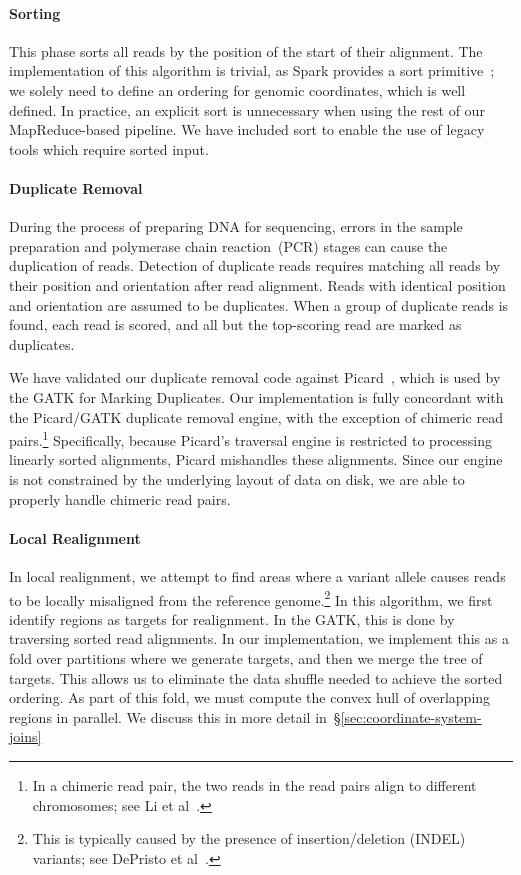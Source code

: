 \documentclass{acm_proc_article-sp}
\begin{document}
\paragraph{Sorting}
\label{sec:sorting}
This phase sorts all reads by the position of the start of their alignment. The implementation of this
algorithm is trivial, as Spark provides a sort primitive~\cite{zaharia10}; we solely need to define an
ordering for genomic coordinates, which is well defined. In practice, an explicit sort is unnecessary when
using the rest of our MapReduce-based pipeline. We have included sort to enable the use of legacy
tools which require sorted input.

\paragraph{Duplicate Removal} 
\label{sec:duplicate-removal}
During the process of preparing DNA for sequencing, errors in the sample preparation and polymerase
chain reaction~(PCR) stages can cause the duplication of reads. Detection of duplicate reads requires
matching all reads by their position and orientation after read alignment. Reads with identical position
and orientation are assumed to be duplicates. When a group of duplicate reads is found, each read is
scored, and all but the top-scoring read are marked as duplicates.

We have validated our duplicate removal code against Picard~\cite{picard}, which is used by the GATK
for Marking Duplicates. Our implementation is fully concordant with the Picard/GATK duplicate removal
engine, with the exception of chimeric read pairs.\footnote{In a chimeric read pair, the two reads in the
read pairs align to different chromosomes; see Li et al~\cite{li10}.} Specifically, because Picard's
traversal engine is restricted to processing linearly sorted alignments, Picard mishandles these
alignments. Since our engine is not constrained by the underlying layout of data on disk, we are able
to properly handle chimeric read pairs.

\paragraph{Local Realignment} 
\label{sec:local-realignment}

In local realignment, we attempt to find areas where a variant allele causes reads to be locally misaligned
from the reference genome.\footnote{This is typically caused by the presence of insertion/deletion (INDEL)
variants; see DePristo et al~\cite{depristo11}.} In this algorithm, we first identify regions as targets for
realignment. In the GATK, this is done by traversing sorted read alignments. In our implementation, we
implement this as a fold over partitions where we generate targets, and then we merge the tree of targets.
This allows us to eliminate the data shuffle needed to achieve the sorted ordering. As part of this fold, we
must compute the convex hull of overlapping regions in parallel. We discuss this in more detail
in~\S\ref{sec:coordinate-system-joins}
\end{document}
